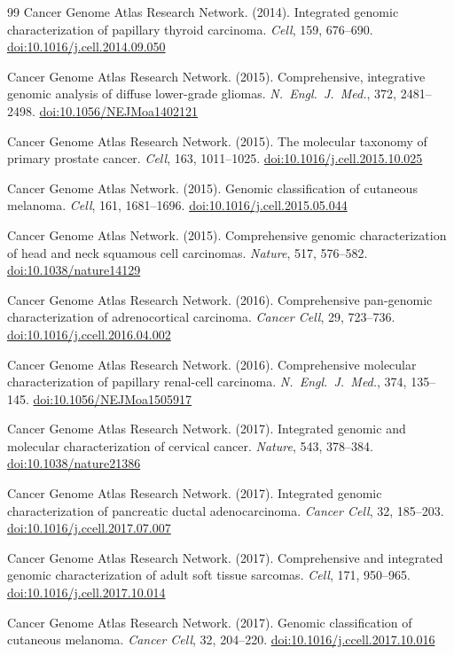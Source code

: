 \documentclass[12pt,a4paper]{article}
\newcommand{\doi}[1]{\href{https://doi.org/#1}{doi:#1}}
\begin{document}
\begin{thebibliography}{99}
Cancer Genome Atlas Research Network. (2014).
Integrated genomic characterization of papillary thyroid carcinoma.
\textit{Cell}, 159, 676--690.
\doi{10.1016/j.cell.2014.09.050}

Cancer Genome Atlas Research Network. (2015).
Comprehensive, integrative genomic analysis of diffuse lower-grade gliomas.
\textit{N.\ Engl.\ J.\ Med.}, 372, 2481--2498.
\doi{10.1056/NEJMoa1402121}

Cancer Genome Atlas Research Network. (2015).
The molecular taxonomy of primary prostate cancer.
\textit{Cell}, 163, 1011--1025.
\doi{10.1016/j.cell.2015.10.025}

Cancer Genome Atlas Network. (2015).
Genomic classification of cutaneous melanoma.
\textit{Cell}, 161, 1681--1696.
\doi{10.1016/j.cell.2015.05.044}

Cancer Genome Atlas Network. (2015).
Comprehensive genomic characterization of head and neck squamous cell carcinomas.
\textit{Nature}, 517, 576--582.
\doi{10.1038/nature14129}

Cancer Genome Atlas Research Network. (2016).
Comprehensive pan-genomic characterization of adrenocortical carcinoma.
\textit{Cancer Cell}, 29, 723--736.
\doi{10.1016/j.ccell.2016.04.002}

Cancer Genome Atlas Research Network. (2016).
Comprehensive molecular characterization of papillary renal-cell carcinoma.
\textit{N.\ Engl.\ J.\ Med.}, 374, 135--145.
\doi{10.1056/NEJMoa1505917}

Cancer Genome Atlas Research Network. (2017).
Integrated genomic and molecular characterization of cervical cancer.
\textit{Nature}, 543, 378--384.
\doi{10.1038/nature21386}

Cancer Genome Atlas Research Network. (2017).
Integrated genomic characterization of pancreatic ductal adenocarcinoma.
\textit{Cancer Cell}, 32, 185--203.
\doi{10.1016/j.ccell.2017.07.007}

Cancer Genome Atlas Research Network. (2017).
Comprehensive and integrated genomic characterization of adult soft tissue sarcomas.
\textit{Cell}, 171, 950--965.
\doi{10.1016/j.cell.2017.10.014}

Cancer Genome Atlas Research Network. (2017).
Genomic classification of cutaneous melanoma.
\textit{Cancer Cell}, 32, 204--220.
\doi{10.1016/j.ccell.2017.10.016}


\end{thebibliography}
\end{document}
